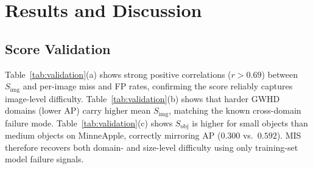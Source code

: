 \documentclass[conference]{IEEEtran}
\begin{document}
\section{Results and Discussion}

\subsection{Score Validation}

Table~\ref{tab:validation}(a) shows strong positive correlations
($r{>}0.69$) between $S_{\mathrm{img}}$ and per-image miss and FP
rates, confirming the score reliably captures image-level difficulty.
Table~\ref{tab:validation}(b) shows that harder GWHD domains (lower
AP) carry higher mean $S_{\mathrm{img}}$, matching the known
cross-domain failure mode. Table~\ref{tab:validation}(c) shows
$S_{\mathrm{obj}}$ is higher for small objects than medium objects on
MinneApple, correctly mirroring AP ($0.300$ vs.\ $0.592$). MIS
therefore recovers both domain- and size-level difficulty using only
training-set model failure signals.

\begin{table}[t]
\centering
\caption{Score validation. \textbf{(a)}~Pearson $r$ of $S_{\mathrm{img}}$
with miss/FP rates. \textbf{(b)}~GWHD domain AP vs.\ mean
$S_{\mathrm{img}}$. \textbf{(c)}~MinneApple scores by object size.}
\label{tab:validation}
\end{table}
\end{document}
